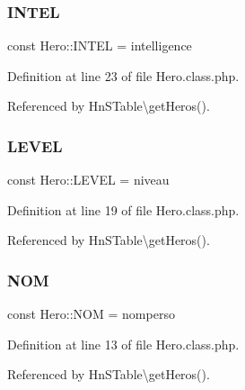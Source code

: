 \mbox{\label{class_hero_a71e6a572e24cbe3edf59791b84df8ee4}} 
\subsubsection{\texorpdfstring{I\+N\+T\+EL}{INTEL}}
{\footnotesize\ttfamily const Hero\+::\+I\+N\+T\+EL = \textquotesingle{}intelligence\textquotesingle{}}



Definition at line 23 of file Hero.\+class.\+php.



Referenced by Hn\+S\+Table\textbackslash{}get\+Heros().

\mbox{\label{class_hero_ae811e1aee75710f93c27be7ab58ec127}} 
\subsubsection{\texorpdfstring{L\+E\+V\+EL}{LEVEL}}
{\footnotesize\ttfamily const Hero\+::\+L\+E\+V\+EL = \textquotesingle{}niveau\textquotesingle{}}



Definition at line 19 of file Hero.\+class.\+php.



Referenced by Hn\+S\+Table\textbackslash{}get\+Heros().

\mbox{\label{class_hero_a990363ff56776461c08d1e5fc6731176}} 
\subsubsection{\texorpdfstring{N\+OM}{NOM}}
{\footnotesize\ttfamily const Hero\+::\+N\+OM = \textquotesingle{}nomperso\textquotesingle{}}



Definition at line 13 of file Hero.\+class.\+php.



Referenced by Hn\+S\+Table\textbackslash{}get\+Heros().

\mbox{\label{class_hero_a8638ccc74f66a3fbebfe14758e019067}} 

